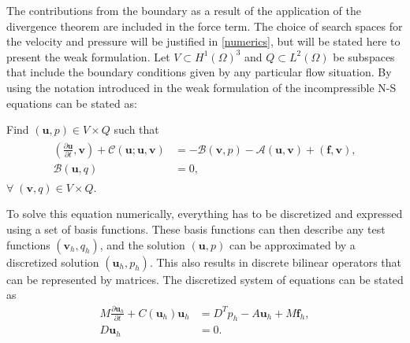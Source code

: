 %
The contributions from the boundary as a result of the application of the divergence theorem are included in the 
force term.
The choice of search spaces for the velocity and pressure will be justified in \cref{numerics}, but will 
be stated here to present the weak formulation. Let $V \subset H^1(\Omega)^3$ and $Q \subset L^2(\Omega)$ 
be subspaces that include the boundary conditions given by any particular flow situation.
By using the notation introduced in  the weak formulation of the incompressible
N-S equations can be stated as: 

Find $(\mathbf{u}, p) \in V\times Q$ such that 
\begin{align}
    \begin{split}
        (\frac{\partial \mathbf{u}}{\partial t},\mathbf{v})
        + \mathcal{C}(\mathbf{u};\mathbf{u},\mathbf{v})
        &= -\mathcal{B}(\mathbf{v},p) 
        -\mathcal{A}(\mathbf{u},\mathbf{v})
        + (\mathbf{f},\mathbf{v}), \\
        \mathcal{B}(\mathbf{u},q) &= 0,
    \end{split}
	\label{eq:NSweak}
\end{align}
$\forall\; (\mathbf{v}, q) \in V\times Q$.
%

To solve this equation numerically, everything has to be discretized and expressed 
using a set of basis functions. These basis functions can then describe any test functions
$(\mathbf{v}_h,q_h)$, and the solution $(\mathbf{u},p)$ can be approximated by a discretized 
solution $(\mathbf{u}_h,p_h)$. This also results in discrete bilinear operators that can be
represented by matrices. The discretized system of equations can be stated as
%
\begin{align}
    M\frac{\partial \mathbf{u}_h}{\partial t} +C(\mathbf{u}_h)\mathbf{u}_h 
    &= D^Tp_h-A\mathbf{u}_h +M\mathbf{f}_h,\\
    D\mathbf{u}_h &= 0.
    \label{eq:NSMatrixform}
\end{align}
%

